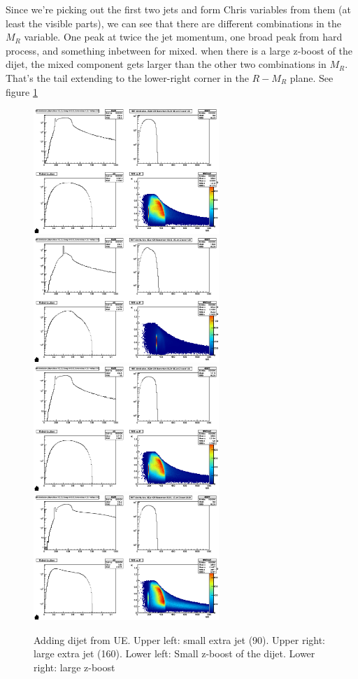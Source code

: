 \documentclass{fheadnote}
\begin{document}
Since we're picking out the first two jets and form Chris variables from them (at least the visible parts), we can see that there are
different combinations in the $M_R$ variable.  One peak at twice the jet momentum, one broad peak from hard process, and something inbetween for mixed.
when there is a large z-boost of the dijet, the mixed component gets larger than the other two combinations in $M_R$.
That's the tail extending to the lower-right corner in the $R-M_R$ plane.  See figure \ref{Figure_MRToy8}

\begin{figure}[htbp]
   \centering
   \includegraphics[width=7cm]{Figures/MRToy8_SmallJet}
   \includegraphics[width=7cm]{Figures/MRToy8_LargeJet}\\
   \includegraphics[width=7cm]{Figures/MRToy8_SmallBoost}
   \includegraphics[width=7cm]{Figures/MRToy8_LargeBoost}
   \caption{Adding dijet from UE.  Upper left: small extra jet (90).  Upper right: large extra jet (160).  Lower left: Small z-boost of the dijet.  Lower right: large z-boost}
   \label{Figure_MRToy8}
\end{figure}
\end{document}
